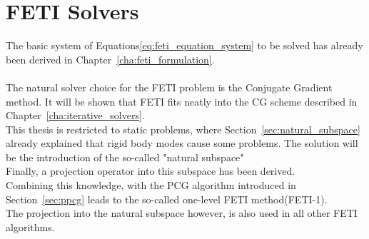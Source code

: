 \chapter{FETI Solvers}\label{cha:feti_solvers}
The basic system of Equations\eqref{eq:feti_equation_system} to be solved has already been derived in Chapter~\ref{cha:feti_formulation}.
\\
\\
The natural solver choice for the FETI problem is the Conjugate Gradient method. It will be shown that FETI fits neatly into the CG scheme described in Chapter~\ref{cha:iterative_solvers}.\\
This thesis is restricted to static problems, where Section~\ref{sec:natural_subspace} already explained that rigid body modes cause some problems. The solution will be the introduction of the so-called "natural subspace"
\\
Finally, a projection operator into this subspace has been derived.\\
Combining this knowledge, with the PCG algorithm introduced in Section~\ref{sec:ppcg} leads to the so-called one-level FETI method(FETI-1).\\
The projection into the natural subspace however, is also used in all other FETI algorithms.




